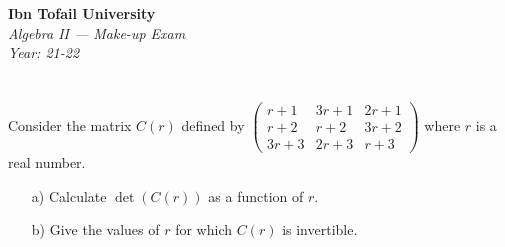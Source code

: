 \documentclass[12pt]{article}
\begin{document}
\begin{center}
  \Large\textbf{Ibn Tofail University} \\[1em]
  \large\textit{Algebra II — Make-up Exam} \\[0.5em]
  \large\textit{Year: 21-22} \\[2em]
\end{center}

\vspace{0.5cm}

\section{}
Consider the matrix $C(r)$ defined by
$\begin{pmatrix}
r+1 & 3r+1 & 2r+1 \\
r+2 & r+2 & 3r+2 \\
3r+3 & 2r+3 & r+3
\end{pmatrix}$
where $r$ is a real number.
\begin{enumerate}
\item[a)] Calculate $\det(C(r))$ as a function of $r$.
\item[b)] Give the values of $r$ for which $C(r)$ is invertible.
\end{enumerate}

\newpage
\end{document}
